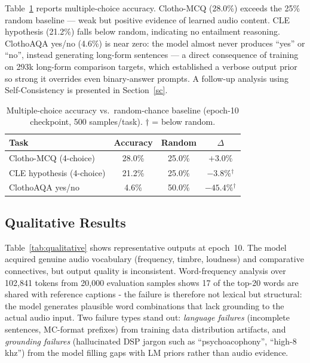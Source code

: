 \documentclass[cameraready]{Interspeech}
\begin{document}
Table~\ref{tab:mc_accuracy} reports multiple-choice accuracy. Clotho-MCQ (28.0\%) exceeds the 25\% random baseline — weak but positive evidence of learned audio content. CLE hypothesis (21.2\%) falls below random, indicating no entailment reasoning. ClothoAQA yes/no (4.6\%) is near zero: the model almost never produces ``yes'' or ``no'', instead generating long-form sentences — a direct consequence of training on 293k long-form comparison targets, which established a verbose output prior so strong it overrides even binary-answer prompts. A follow-up analysis using Self-Consistency is presented in Section~\ref{sc}.

\begin{table}[h]
\centering
\caption{Multiple-choice accuracy vs.\ random-chance baseline (epoch-10 checkpoint, 500 samples/task). $\dagger$ = below random.}
\label{tab:mc_accuracy}
\setlength{\tabcolsep}{3pt}
\begin{tabular}{lccc}
\toprule
\textbf{Task} & \textbf{Accuracy} & \textbf{Random} & \textbf{$\Delta$} \\
\midrule
Clotho-MCQ (4-choice)      & 28.0\% & 25.0\% & $+3.0\%$ \\
CLE hypothesis (4-choice)  & 21.2\% & 25.0\% & $-3.8\%$$^\dagger$ \\
ClothoAQA yes/no           &  4.6\% & 50.0\% & $-45.4\%$$^\dagger$ \\
\bottomrule
\end{tabular}
\end{table}

\subsection{Qualitative Results}

Table~\ref{tab:qualitative} shows representative outputs at epoch~10. The model acquired genuine audio vocabulary (frequency, timbre, loudness) and comparative connectives, but output quality is inconsistent. Word-frequency analysis over 102,841 tokens from 20,000 evaluation samples shows 17 of the top-20 words are shared with reference captions - the failure is therefore not lexical but structural: the model generates plausible word combinations that lack grounding to the actual audio input. Two failure types stand out: \textit{language failures} (incomplete sentences, MC-format prefixes) from training data distribution artifacts, and \textit{grounding failures} (hallucinated DSP jargon such as ``psychoacophony'', ``high-8 khz'') from the model filling gaps with LM priors rather than audio evidence.
\end{document}
